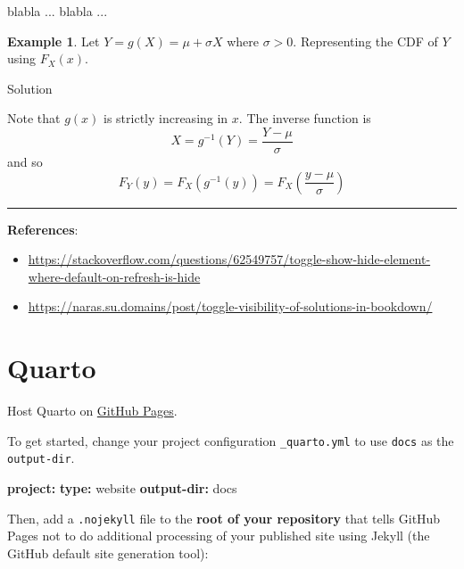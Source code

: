 \documentclass[
  a4paper,
  twoside,
  openright]{book}
\newenvironment{Shaded}{\begin{snugshade}}{\end{snugshade}}
\newcommand{\AttributeTok}[1]{\textcolor[rgb]{0.13,0.29,0.53}{#1}}
\newcommand{\FunctionTok}[1]{\textcolor[rgb]{0.13,0.29,0.53}{\textbf{#1}}}
\newcommand{\KeywordTok}[1]{\textcolor[rgb]{0.13,0.29,0.53}{\textbf{#1}}}
\newcommand{\NormalTok}[1]{#1}
\providecommand{\tightlist}{%
  \setlength{\itemsep}{0pt}\setlength{\parskip}{0pt}}
\theoremstyle{definition}
\theoremstyle{definition}
\newtheorem{example}{Example}[chapter]
\theoremstyle{definition}
\theoremstyle{definition}
\theoremstyle{remark}
\begin{document}
\begin{Shaded}
\begin{Highlighting}[]
\NormalTok{blabla ...}
\NormalTok{blabla ...}
\end{Highlighting}
\end{Shaded}

\begin{example}
\protect\hypertarget{exm:ex1}{}\label{exm:ex1}Let \(Y=g(X)=\mu+\sigma X\) where \(\sigma>0\). Representing the CDF of \(Y\) using \(F_X(x)\).
\end{example}

Solution

\label{myDIV}
Note that \(g(x)\) is strictly increasing in \(x\).
The inverse function is
\[
X = g^{-1}(Y) = \frac{Y-\mu}{\sigma}
\]
and so
\[
F_Y(y) = F_X\left(g^{-1}(y)\right) = F_X\left(\frac{y-\mu}{\sigma}\right)
\]

\begin{center}\rule{0.5\linewidth}{0.5pt}\end{center}

\textbf{References}:

\begin{itemize}
\tightlist
\item
  \url{https://stackoverflow.com/questions/62549757/toggle-show-hide-element-where-default-on-refresh-is-hide}
\item
  \url{https://naras.su.domains/post/toggle-visibility-of-solutions-in-bookdown/}
\end{itemize}

\section{Quarto}\label{quarto}

Host Quarto on \href{https://quarto.org/docs/publishing/github-pages.html}{GitHub Pages}.

To get started, change your project configuration \texttt{\_quarto.yml} to use \texttt{docs} as the \texttt{output-dir}.

\begin{Shaded}
\begin{Highlighting}[]
\FunctionTok{project}\KeywordTok{:}
\AttributeTok{  }\FunctionTok{type}\KeywordTok{:}\AttributeTok{ website}
\AttributeTok{  }\FunctionTok{output{-}dir}\KeywordTok{:}\AttributeTok{ docs}
\end{Highlighting}
\end{Shaded}

Then, add a \texttt{.nojekyll} file to the \textbf{root of your repository} that tells GitHub Pages not to do additional processing of your published site using Jekyll (the GitHub default site generation tool):
\end{document}
